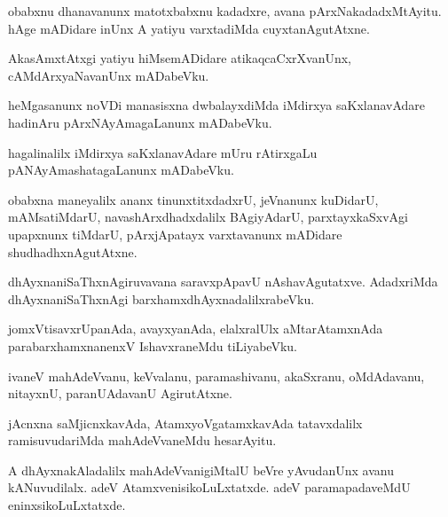 \documentclass{article}
\begin{document}
\begin{mn}
obabxnu dhanavanunx matotxbabxnu kadadxre, avana pArxNakadadxMtAyitu. hAge mADidare inUnx A yatiyu 
varxtadiMda cuyxtanAgutAtxne.
\end{mn}

\begin{mn}
AkasAmxtAtxgi yatiyu hiMsemADidare atikaqcaCxrXvanUnx, cAMdArxyaNavanUnx mADabeVku.
\end{mn}

\begin{mn}
heMgasanunx noVDi manasisxna dwbalayxdiMda iMdirxya saKxlanavAdare hadinAru pArxNAyAmagaLanunx 
mADabeVku.
\end{mn}

\begin{mn}
hagalinalilx iMdirxya saKxlanavAdare mUru rAtirxgaLu pANAyAmashatagaLanunx mADabeVku.
\end{mn}

\begin{mn}
obabxna maneyalilx ananx tinunxtitxdadxrU, jeVnanunx kuDidarU, mAMsatiMdarU, navashArxdhadxdalilx 
BAgiyAdarU, parxtayxkaSxvAgi upapxnunx tiMdarU, pArxjApatayx varxtavanunx mADidare 
shudhadhxnAgutAtxne.
\end{mn}

\begin{mn}
dhAyxnaniSaThxnAgiruvavana saravxpApavU nAshavAgutatxve. AdadxriMda dhAyxnaniSaThxnAgi 
barxhamxdhAyxnadalilxrabeVku.
\end{mn}

\begin{mn}
jomxVtisavxrUpanAda, avayxyanAda, elalxralUlx aMtarAtamxnAda parabarxhamxnanenxV IshavxraneMdu 
tiLiyabeVku.
\end{mn}

\begin{mn}
ivaneV mahAdeVvanu, keVvalanu, paramashivanu, akaSxranu, oMdAdavanu, nitayxnU, paranUAdavanU 
AgirutAtxne.
\end{mn}

\begin{mn}
jAcnxna saMjicnxkavAda, AtamxyoVgatamxkavAda tatavxdalilx ramisuvudariMda mahAdeVvaneMdu hesarAyitu.
\end{mn}

\begin{mn}
A dhAyxnakAladalilx mahAdeVvanigiMtalU beVre yAvudanUnx avanu kANuvudilalx. adeV 
AtamxvenisikoLuLxtatxde. adeV paramapadaveMdU eninxsikoLuLxtatxde.
\end{mn}
\end{document}

